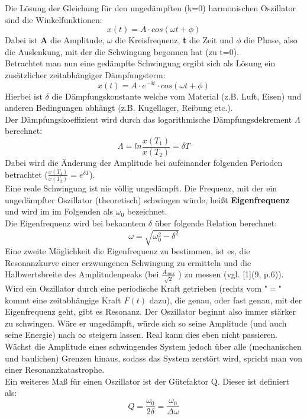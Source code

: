 \documentclass[12pt,a4paper]{article}
\begin{document}
\begin{multicols}{2}
\noindent Die Lösung der Gleichung für den ungedämpften (k=0) harmonischen Oszillator sind die Winkelfunktionen:
$$x(t) = A \cdot cos(\omega t + \phi)$$
Dabei ist \textbf{A} die Amplitude, \textbf{$\omega$} die Kreisfrequenz, \textbf{t} die Zeit und \textbf{$\phi$} die Phase, also die Auslenkung, mit der die Schwingung begonnen hat (zu t=0).\\
Betrachtet man nun eine gedämpfte Schwingung ergibt sich als Lösung ein zusätzlicher zeitabhängiger Dämpfungsterm: 
$$x(t) = A \cdot e^{- \delta t} \cdot cos(\omega t + \phi)$$ 
Hierbei ist $\delta$ die Dämpfungskonstante welche vom Material (z.B. Luft, Eisen) und anderen Bedingungen abhängt (z.B. Kugellager, Reibung etc.).\\
Der Dämpfungskoeffizient  wird durch das logarithmische Dämpfungsdekrement $\Lambda$ berechnet:
$$\Lambda = ln \frac{x(T_1)}{x(T_2)} = \delta T$$
Dabei wird die Änderung der Amplitude bei aufeinander folgenden Perioden betrachtet ($\frac{x(T_1)}{x(T_2)} = e^{\delta T}$).\\

\noindent Eine reale Schwingung ist nie völlig ungedämpft. Die Frequenz, mit der ein ungedämpfter Oszillator (theoretisch) schwingen würde, heißt \textbf{Eigenfrequenz} und wird im im Folgenden als $\omega_0$ bezeichnet.\\
Die Eigenfrequenz wird bei bekanntem $\delta$ über folgende Relation berechnet:
$$\omega = \sqrt{\omega_0^2 - \delta^2}$$
Eine zweite Möglichkeit die Eigenfrequenz zu bestimmen, ist es, die Resonanzkurve einer erzwungenen Schwingung zu ermitteln und die Halbwertsbreite des Amplitudenpeaks (bei $\frac{A_{max}}{\sqrt{2}}$ ) zu messen (vgl. [1](9, p.6)).\\
Wird ein Oszillator durch eine periodische Kraft getrieben (rechts vom "$=$" kommt eine zeitabhängige Kraft $F(t)$ dazu), die genau, oder fast genau, mit der Eigenfrequenz geht, gibt es Resonanz. Der Oszillator beginnt also immer stärker zu schwingen. Wäre er ungedämpft, würde sich so seine Amplitude (und auch seine Energie) nach $\infty$ steigern lassen. Real kann dies eben nicht passieren.\\
Wächst die Amplitude eines schwingendes System jedoch über alle (mechanischen und baulichen) Grenzen hinaus, sodass das System zerstört wird, spricht man von einer Resonanzkatastrophe.\\
Ein weiteres Maß für einen Oszillator ist der Gütefaktor Q. Dieser ist definiert als:
$$Q = \frac{\omega_0}{2\delta} = \frac{\omega_0}{\Delta \omega}$$







\end{multicols}
\end{document}
